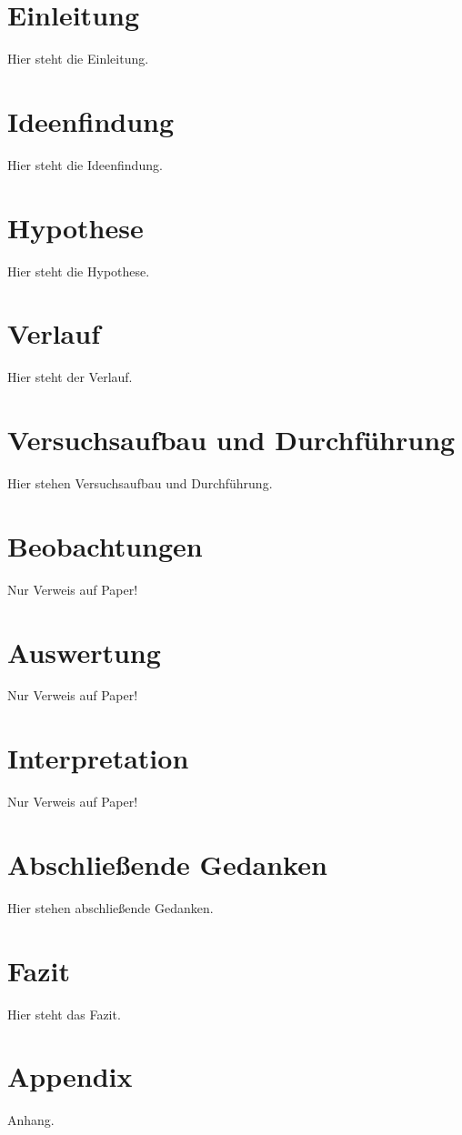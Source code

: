 \documentclass{Bericht}
\begin{document}
\maketitle


\tableofcontents
\clearpage

\section{Einleitung}
	Hier steht die Einleitung.

\section{Ideenfindung}
	Hier steht die Ideenfindung.

\section{Hypothese}
	Hier steht die Hypothese.

\section{Verlauf}
	Hier steht der Verlauf.

\section{Versuchsaufbau und Durchführung}
	Hier stehen Versuchsaufbau und Durchführung.

\section{Beobachtungen}
	Nur Verweis auf Paper!

\section{Auswertung}
	Nur Verweis auf Paper!

\section{Interpretation}
	Nur Verweis auf Paper!

\section{Abschließende Gedanken}
	Hier stehen abschließende Gedanken.
	
\section{Fazit}
	Hier steht das Fazit.
	
\section{Appendix} %
	Anhang.
	
\vfill %

\printbibliography
\end{document}

